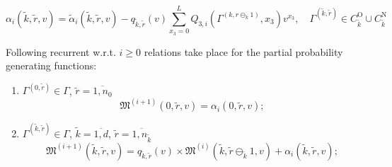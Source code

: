 \documentclass[runningheads,a4paper]{llncs}
\begin{document}
\begin{equation*}
\alpha_i(\tilde{k},\tilde{r},v) =\tilde{\alpha}_i(\tilde{k},\tilde{r},v) - q_{\tilde{k},\tilde{r}}(v) \sum_{x_3=0}^{L} Q_{3,i}(\Gamma^{(k,r\ominus_k 1)},x_3) v^{x_3}, \quad \Gamma^{(\tilde{k}, \tilde{r})} \in C_{\tilde{k}}^{\mathrm{O}} \cup C_{\tilde{k}}^{\mathrm{N}}
\end{equation*}
\begin{theorem}
Following recurrent w.r.t. $i
\geqslant 0$ relations take place for the  partial probability generating functions:
\begin{enumerate}
\item $\Gamma^{(0,\tilde{r})} \in \Gamma$, $\tilde{r} = \overline{1,n_0}$ 
$$
\mathfrak{M}^{(i+1)}(0,\tilde{r},v) = \alpha_i(0,\tilde{r},v);
$$
\item $\Gamma^{(\tilde{k},\tilde{r})} \in \Gamma $, $\tilde{k} =\overline{1,d}$, $\tilde{r}=\overline{1,n_{\tilde{k}}}$
$$
\mathfrak{M}^{(i+1)}(\tilde{k},\tilde{r},v) = q_{\tilde{k},\tilde{r}} (v)\times  \mathfrak{M}^{(i)}(\tilde{k},\tilde{r} \ominus_{\tilde{k}} 1,v) + \alpha_i(\tilde{k},\tilde{r},v);
$$
\end{enumerate}
\end{theorem}
\end{document}
